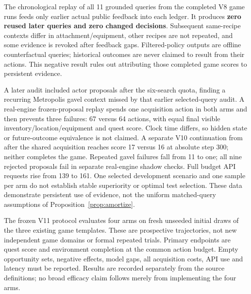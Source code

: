 \documentclass[11pt]{article}
\theoremstyle{definition}
\begin{document}
The chronological replay of all 11 grounded queries from the completed V8 game
runs feeds only earlier actual public feedback into each ledger. It produces
\textbf{zero reused later queries and zero changed decisions}. Subsequent
same-recipe contexts differ in attachment/equipment, other recipes are not
repeated, and some evidence is revoked after feedback gaps. Filtered-policy
outputs are offline counterfactual queries; historical outcomes are never claimed
to result from their actions. This negative result rules out attributing those
completed game scores to persistent evidence.

A later audit included actor proposals after the six-search quota, finding a
recurring Metropolis gavel context missed by that earlier selected-query audit.
A real-engine frozen-proposal replay spends one acquisition action in both arms
and then prevents three failures: 67 versus 64 actions, with equal final visible
inventory/location/equipment and quest score. Clock time differs, so hidden
state or future-outcome equivalence is not claimed. A separate V10 continuation
from after the shared acquisition reaches score 17 versus 16 at absolute step
300; neither completes the game. Repeated gavel failures fall from 11 to one;
all nine rejected proposals fail in separate real-engine shadow checks. Full
budget API requests rise from 139 to 161. One selected development scenario
and one sample per arm do not establish stable superiority or optimal test
selection. These data demonstrate persistent use of evidence, not the uniform
matched-query assumptions of Proposition~\ref{prop:amortize}.

The frozen V11 protocol evaluates four arms on fresh unseeded initial draws of
the three existing game templates. These are prospective trajectories, not new
independent game domains or formal repeated trials. Primary endpoints are quest
score and environment completion at the common action budget. Empty opportunity
sets, negative effects, model gaps, all acquisition costs, API use and latency
must be reported. Results are recorded separately from the source definitions;
no broad efficacy claim follows merely from implementing the four arms.
\end{document}
